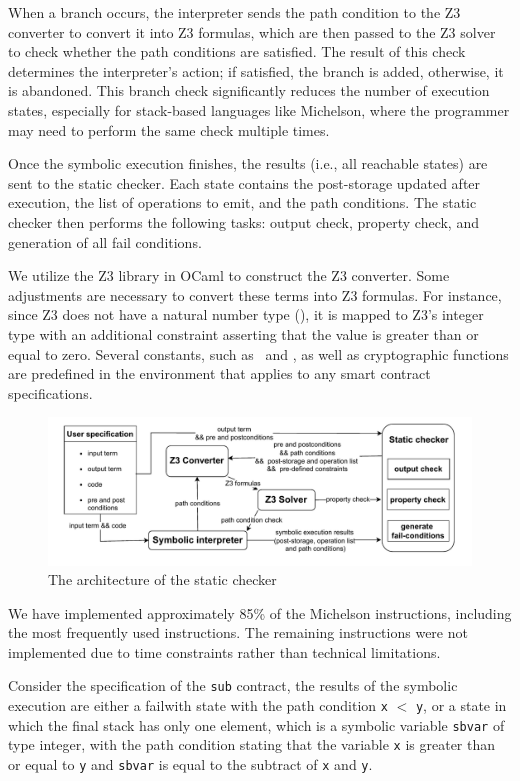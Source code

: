 \documentclass[runningheads]{llncs}
\begin{document}
When a branch occurs, the interpreter sends the path condition to the Z3 converter to convert it into Z3 formulas, which are then passed to the Z3 solver to check whether the path conditions are satisfied. The result of this check determines the interpreter's action; if satisfied, the branch is added, otherwise, it is abandoned. This branch check significantly reduces the number of execution states, especially for stack-based languages like Michelson, where the programmer may need to perform the same check multiple times.

Once the symbolic execution finishes, the results (i.e., all reachable states) are sent to the static checker. Each state contains the post-storage updated after execution, the list of operations to emit, and the path conditions. The static checker then performs the following tasks: output check, property check, and generation of all fail conditions.

We utilize the Z3 library in OCaml to construct the Z3 converter. Some adjustments are necessary to convert these terms into Z3 formulas. For instance, since Z3 does not have a natural number type (\TNAT), it is mapped to Z3's integer type with an additional constraint asserting that the value is greater than or equal to zero. Several constants, such as \CAMOUNT\ and \CBALANCE, as well as cryptographic functions are predefined in the environment that applies to any smart contract specifications.
\begin{figure}[tp]
    \centering
    \includegraphics[width=1\textwidth]{scv}
    \caption{The architecture of the static checker}
    \label{fig:architecture-of-static-checker}
\end{figure}

We have implemented approximately 85\% of the Michelson instructions,
including the most frequently used instructions. The remaining instructions were not implemented due to time constraints rather than technical limitations.

Consider the specification of the \lstinline/sub/ contract, the results of
the symbolic execution are either a failwith state with the path
condition \lstinline/x/ $<$ \lstinline/y/,  or a state in which the
final stack has only one element, which is a symbolic variable
\lstinline/sbvar/ of type integer, with the path condition stating
that the variable \lstinline/x/ is greater than or equal to
\lstinline/y/ and  \lstinline/sbvar/ is equal to
the subtract of \lstinline/x/ and \lstinline/y/. 
\end{document}
